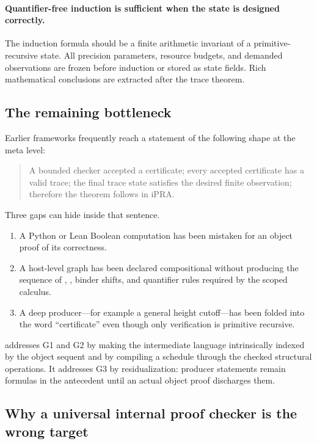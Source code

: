 \paragraph{Quantifier-free induction is sufficient when the state is designed correctly.}
The induction formula should be a finite arithmetic invariant of a primitive-recursive state.  All
precision parameters, resource budgets, and demanded observations are frozen before induction or
stored as state fields.  Rich mathematical conclusions are extracted after the trace theorem.

\subsection{The remaining bottleneck}

Earlier frameworks frequently reach a statement of the following shape at the meta level:

\begin{quote}
A bounded checker accepted a certificate; every accepted certificate has a valid trace; the final
trace state satisfies the desired finite observation; therefore the theorem follows in iPRA.
\end{quote}

Three gaps can hide inside that sentence.

\begin{enumerate}[label=\textbf{G\arabic*.}]
\item A Python or Lean Boolean computation has been mistaken for an object proof of its correctness.
\item A host-level graph has been declared compositional without producing the sequence of
, , binder shifts, and quantifier rules required by the scoped
calculus.
\item A deep producer---for example a general height cutoff---has been folded into the word
``certificate'' even though only verification is primitive recursive.
\end{enumerate}

\TAPIR{} addresses G1 and G2 by making the intermediate language intrinsically indexed by the
object sequent and by compiling a schedule through the checked structural operations.  It addresses
G3 by residualization: producer statements remain formulas in the antecedent until an actual object
proof discharges them.

\subsection{Why a universal internal proof checker is the wrong target}

